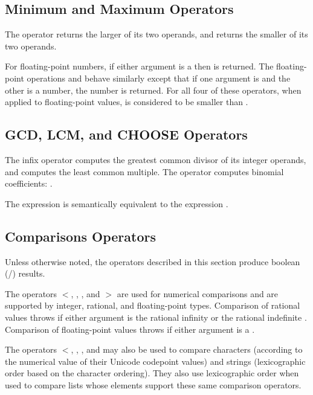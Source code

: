 \subsection{Minimum and Maximum Operators}

The operator  returns the larger of its two operands,
and  returns the smaller of its two operands.

For floating-point numbers, if either argument is a  then
 is returned.  The floating-point operations  and
behave similarly except that if one argument is  and the
other is a number, the number is returned.  For all four of these
operators, when applied to floating-point values,
 is considered to be smaller than .

\subsection{GCD, LCM, and CHOOSE Operators}

The infix operator  computes the greatest common
divisor of its integer operands, and  computes the least
common multiple.  The operator  computes binomial
coefficients:
.

The expression  is semantically equivalent to the expression
.


\subsection{Comparisons Operators}

Unless otherwise noted, the operators described in this section
produce boolean (/) results.

The operators $<$, \EXP{\leq}, \EXP{\geq}, and $>$ are
  used for numerical comparisons
and are supported by integer, rational, and floating-point types.
Comparison of rational values throws 
if either argument is the rational infinity  or the
rational indefinite .
Comparison of floating-point values throws 
if either argument is a .

The operators $<$, \EXP{\leq}, \EXP{\geq}, and \EXP{>} may also be
used to compare characters
(according to the numerical value of their Unicode codepoint values)
and strings (lexicographic order based on the character ordering).
They also use lexicographic order when used to compare lists
whose elements support these same comparison operators.

